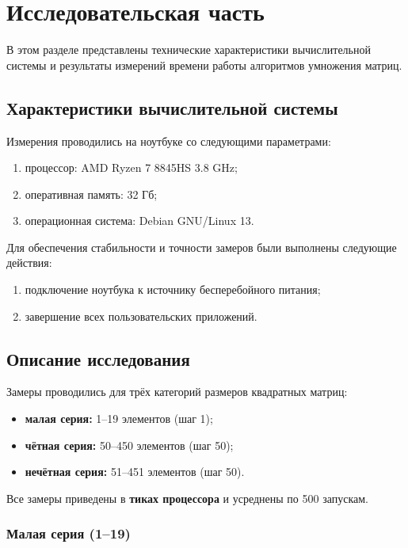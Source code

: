 \chapter{Исследовательская часть}

В этом разделе представлены технические характеристики вычислительной системы и результаты измерений времени работы алгоритмов умножения матриц.

\section{Характеристики вычислительной системы}

Измерения проводились на ноутбуке со следующими параметрами:
\begin{enumerate}
	\item процессор:  AMD Ryzen 7 8845HS 3.8 GHz;
	\item оперативная память: 32 Гб;
	\item операционная система: Debian GNU/Linux 13.
\end{enumerate}

Для обеспечения стабильности и точности замеров были выполнены следующие действия:
\begin{enumerate}
	\item подключение ноутбука к источнику бесперебойного питания;
	\item завершение всех пользовательских приложений.
\end{enumerate}

\section{Описание исследования}

Замеры проводились для трёх категорий размеров квадратных матриц:

\begin{itemize}
	\item \textbf{малая серия:} 1–19 элементов (шаг 1);
	\item \textbf{чётная серия:} 50–450 элементов (шаг 50);
	\item \textbf{нечётная серия:} 51–451 элементов (шаг 50).
\end{itemize}

Все замеры приведены в \textbf{тиках процессора} и усреднены по 500 запускам.

\subsection{Малая серия (1–19)}

